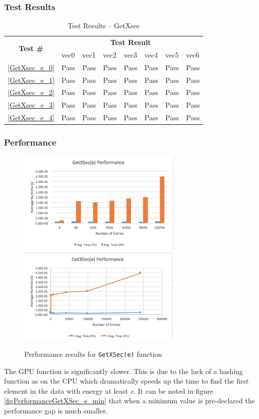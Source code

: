 \documentclass[12pt]{article}
\begin{document}
	\subsubsection{Test Results}
		\begin{table}[H]
		\centering
		\caption{Test Results -- GetXsec}\label{GetXsec_e_acc}
		\begin{tabular}{clllllll}
		\toprule
		\multirow{2}{*}{\bf Test \#} & \multicolumn{7}{c}{\bf Test Result}\\
		& vec0 & vec1 & vec2 & vec3 & vec4 & vec5 & vec6\\\midrule
		\ref{GetXsec_e_0} & Pass & Pass & Pass & Pass & Pass & Pass & Pass\\
		\ref{GetXsec_e_1} & Pass & Pass & Pass & Pass & Pass & Pass & Pass\\
		\ref{GetXsec_e_2} & Pass & Pass & Pass & Pass & Pass & Pass & Pass\\
		\ref{GetXsec_e_3} & Pass & Pass & Pass & Pass & Pass & Pass & Pass\\
		\ref{GetXsec_e_4} & Pass & Pass & Pass & Pass & Pass & Pass & Pass\\
		\bottomrule
		\end{tabular}
		\end{table}
	\subsubsection{Performance}
    	\begin{figure}[H]
    	\centering
    	\caption{Performance results for \texttt{GetXSec(e)} function}\label{figPerformanceGetXSec_e}
    	\includegraphics[width=0.7\textwidth]{getxsec_e_bar.png}
    	\includegraphics[width=0.7\textwidth]{getxsec_e_line.png}
    	\end{figure}
	The GPU function is significantly slower. This is due to the lack of a hashing function as on the CPU which dramatically speeds up the time to find the first element in the data with energy at least \emph{e}. It can be noted in figure \ref{figPerformanceGetXSec_e_min} that when a minimum value is pre-declared the performance gap is much smaller.
	
\end{document}
